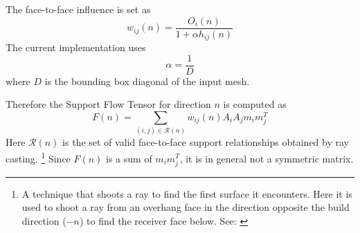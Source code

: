 \documentclass[11pt,a4paper]{article}
\begin{document}
The face-to-face influence is set as
\begin{equation}
w_{ij}(n)
=
\frac{O_i(n)}{1+\alpha h_{ij}(n)}
\end{equation}
The current implementation uses
\begin{equation}
\alpha = \frac{1}{D}
\end{equation}
where $D$ is the bounding box diagonal of the input mesh.

Therefore the Support Flow Tensor for direction $n$ is computed as
\begin{equation}
F(n)
=
\sum_{(i,j)\in \mathcal{R}(n)}
w_{ij}(n)
A_iA_j
m_i m_j^T
\end{equation}
Here $\mathcal{R}(n)$ is the set of valid face-to-face support relationships obtained by ray casting.%
\footnote{A technique that shoots a ray to find the first surface it encounters. Here it is used to shoot a ray
from an overhang face in the direction opposite the build direction ($-n$) to find the receiver face below.
See: \cite{roth1982}}
Since $F(n)$ is a sum of $m_i m_j^T$, it is in general not a symmetric matrix.
\end{document}
